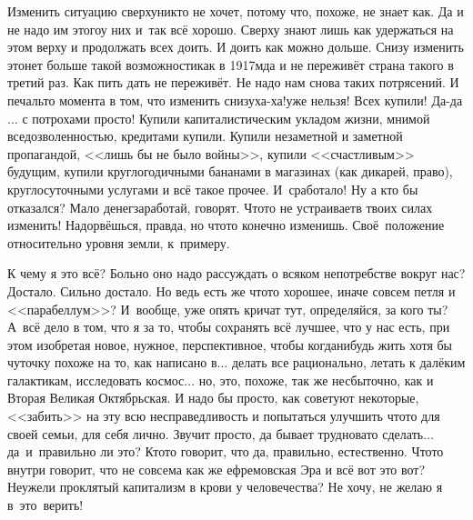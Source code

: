 Изменить ситуацию сверху\mdash никто не хочет, потому что, похоже, не знает как. Да и не надо им этого\mdash у них и~так всё хорошо. Сверху знают лишь как удержаться на этом верху и продолжать всех доить. И доить как можно дольше. Снизу изменить это\mdash нет больше такой возможности\mdash как в 1917\sdash м\mdash да и не переживёт страна такого в третий раз. Как пить дать не переживёт. Не надо нам снова таких потрясений. И печаль\sdash то момента в том, что изменить снизу\mdash ха-ха!\mdash уже нельзя! Всех купили! Да-да$\ldots$ с потрохами просто! Купили капиталистическим укладом жизни, мнимой вседозволенностью, кредитами купили. Купили незаметной и заметной пропагандой, <<лишь бы не было войны>>, купили <<счастливым>> будущим, купили круглогодичными бананами в магазинах (как дикарей, право), круглосуточными услугами и всё такое прочее. И~сработало! Ну а кто бы отказался? Мало денег\mdash заработай, говорят. Что\sdash то не устраивает\mdash в твоих силах изменить! Надорвёшься, правда, но что\sdash то конечно изменишь. Своё~положение относительно уровня земли, к~примеру.

К чему я это всё? Больно оно надо рассуждать о всяком непотребстве вокруг нас? Достало. Сильно достало. Но ведь есть же что\sdash то хорошее, иначе совсем петля и <<парабеллум>>? И~вообще, уже опять кричат тут, определяйся, за кого ты? А~всё дело в том, что я за то, чтобы сохранять всё лучшее, что у нас есть, при этом изобретая новое, нужное, перспективное, чтобы когда\sdash нибудь жить хотя бы чуточку похоже на то, как написано в\cite{ТуманностьАндромеды}$\ldots$ делать все рационально, летать к далёким галактикам, исследовать космос$\ldots$ но, это, похоже, так же несбыточно, как и Вторая Великая Октябрьская. И надо бы просто, как советуют некоторые, <<забить>> на эту всю несправедливость и попытаться улучшить что\sdash то для своей семьи, для себя лично. Звучит просто, да бывает трудновато сделать$\ldots$ да~и~правильно ли это? Кто\sdash то говорит, что да, правильно, естественно. Что\sdash то внутри говорит, что не совсем\mdash а как же ефремовская Эра и всё вот это вот? Неужели проклятый капитализм в крови у человечества? Не хочу, не желаю я в~это~верить! %

